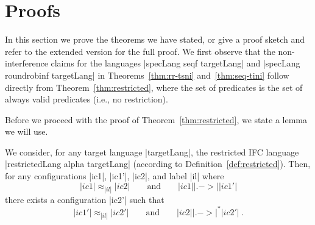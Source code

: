 \section{Proofs}
\label{sec:proofs}

In this section we prove the theorems we have stated, or give a proof
sketch and refer to the extended version for the full proof.
We first observe that the non-interference claims for the languages
|specLang seqf targetLang| and |specLang roundrobinf targetLang|
in Theorems~\ref{thm:rr-tsni} and~\ref{thm:seq-tini} follow directly
from Theorem~\ref{thm:restricted}, where the set
of predicates is the set of always valid predicates (i.e., no restriction).

Before we proceed with the proof of Theorem~\ref{thm:restricted},
we state a lemma we will use.

\begin{lemma}
  \label{lemma:rr-tsni-general}
  We consider, for any target language |targetLang|,
  the restricted IFC language |restrictedLang alpha targetLang|
  (according to Definition~\ref{def:restricted}).
  Then,
  for any configurations |ic1|, |ic1'|, |ic2|, and label |il| where
  \begin{equation} \label{eq:tsni-lemma-lhs}
  |ic1| \approx_{|il|} |ic2|
  \qquad \text{and} \qquad
  |ic1| |.->| |ic1'|
  \end{equation}
  there exists a configuration |ic2'| such that
  \begin{equation} \label{eq:tsni-lemma-rhs}
  |ic1'| \approx_{|il|} |ic2'|
  \qquad \text{and} \qquad
  |ic2| |.->|^* |ic2'|
  \ \text{.}
  \end{equation}
\end{lemma}

